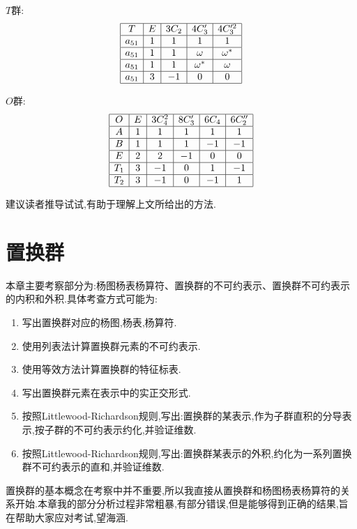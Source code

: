 \documentclass{ctexart}
\begin{document}
$T$群:
\[
\begin{array}{|c|c|c|c|c|}
\hline
T&E&3C_{2}&4C_{3}'&4C_{3}'^{2}\\
\hline
a_{51} &1&1&1&1\\
\hline
a_{51} &1&1&\omega&\omega^{*}\\
\hline
a_{51} &1&1&\omega^{*}&\omega\\
\hline
a_{51} &3&-1&0&0\\
\hline

\end{array}
\]

$O$群:
\[
\begin{array}{|c|c|c|c|c|c|}
\hline
O&E&3C_{4}^{2}&8C_{3}'&6C_{4}&6C_{2}''\\
\hline
A&1&1&1&1&1\\
\hline
B&1&1&1&-1&-1\\
\hline
E&2&2&-1&0&0\\
\hline
T_{1}&3&-1&0&1&-1\\
\hline
T_{2}&3&-1&0&-1&1\\
\hline
\end{array}
\]

建议读者推导试试,有助于理解上文所给出的方法.

\section{置换群}

本章主要考察部分为:杨图杨表杨算符、置换群的不可约表示、置换群不可约表示的内积和外积.具体考查方式可能为:
\begin{enumerate}
    \item 写出置换群对应的杨图,杨表,杨算符.
    \item 使用列表法计算置换群元素的不可约表示.
    \item 使用等效方法计算置换群的特征标表.
    \item 写出置换群元素在表示中的实正交形式.
    \item 按照Littlewood-Richardson规则,写出:置换群的某表示,作为子群直积的分导表示,按子群的不可约表示约化,并验证维数.
    \item 按照Littlewood-Richardson规则,写出:置换群某表示的外积,约化为一系列置换群不可约表示的直和,并验证维数.
\end{enumerate}

置换群的基本概念在考察中并不重要,所以我直接从置换群和杨图杨表杨算符的关系开始.本章我的部分分析过程非常粗暴,有部分错误,但是能够得到正确的结果,旨在帮助大家应对考试,望海涵.
\end{document}
